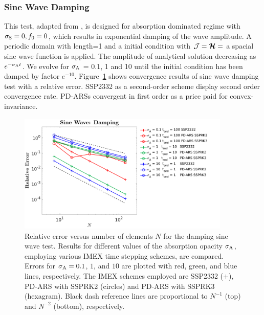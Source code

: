 \subsubsection{Sine Wave Damping}
This test, adapted from \cite{skinnerOstriker_2013}, is designed for absorption dominated regime with $\sigma_{{\rm S}} = 0, f_0 = 0$, which results in exponential damping of the wave amplitude.
A periodic domain with length=1 and a initial condition with $\mathcal{J} = \boldsymbol{\mathcal{H}} =$ a spacial sine wave function is applied.
The amplitude of analytical solution decreasing as $e^{-\sigma_{{\rm A}} t}$.
We evolve for $\sigma_{{\rm A}}$ = 0.1, 1 and 10 until the initial condition has been damped by factor $e^{-10}$. 
Figure~\ref{fig:SineWaveDamping} shows convergence results of sine wave damping test with a relative error.
SSP2332 as a second-order scheme display second order convergence rate.
PD-ARSs convergent in first order as a price paid for convex-invariance.
\begin{figure}[h]
  \centering
    \includegraphics[width=0.9\textwidth]{figures/SineWaveDamping}
   \caption{Relative error versus number of elements $N$ for the damping sine wave test. Results for different values of the absorption opacity $\sigma_{{\rm A}}$, employing various IMEX time stepping schemes, are compared.  Errors for $\sigma_{{\rm A}}=0.1$, $1$, and $10$ are plotted with red, green, and blue lines, respectively.  The IMEX schemes employed are SSP2332 ($+$), PD-ARS with SSPRK2 (circles) and PD-ARS with SSPRK3 (hexagram).  Black dash reference lines are proportional to $N^{-1}$ (top) and $N^{-2}$ (bottom), respectively.}
  \label{fig:SineWaveDamping}
\end{figure}

